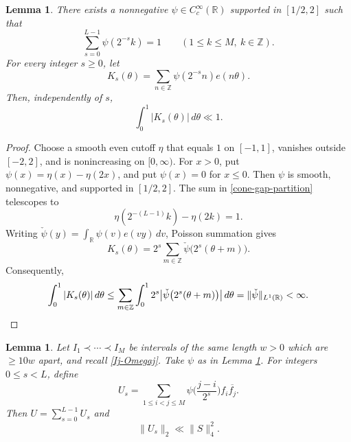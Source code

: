 \documentclass{amsart}
\numberwithin{equation}{section}
\newtheorem{lemma}[theorem]{Lemma}
\newcommand{\ZR}{\mathbb{R}}
\newcommand{\ZZ}{\mathbb{Z}}
\begin{document}
\begin{samepage}
\begin{lemma}
\label{cone-kernel-lem}
There exists a nonnegative $\psi\in C_c^\infty(\ZR)$ supported in $[1/2,2]$ such that
\begin{equation}
\label{cone-gap-partition}
    \sum_{s=0}^{L-1}\psi(2^{-s}k)=1
    \qquad(1\leq k\leq M,\ k\in\ZZ).
\end{equation}
For every integer $s\geq0$, let
\begin{equation}
\nonumber
    K_s(\theta)=\sum_{n\in\ZZ}\psi(2^{-s}n)e(n\theta).
\end{equation}
Then, independently of $s$,
\begin{equation}
\nonumber
    \int_0^1|K_s(\theta)|\,d\theta\ll1.
\end{equation}
\end{lemma}
\end{samepage}

\begin{proof}
Choose a smooth even cutoff $\eta$ that equals $1$ on $[-1,1]$, vanishes outside $[-2,2]$, and is nonincreasing on $[0,\infty)$.
For $x>0$, put $\psi(x)=\eta(x)-\eta(2x)$, and put $\psi(x)=0$ for $x\leq0$. 
Then $\psi$ is smooth, nonnegative, and supported in
$[1/2,2]$. 
The sum in \eqref{cone-gap-partition} telescopes to
\[
    \eta(2^{-(L-1)}k)-\eta(2k)=1.
\]
Writing $\check\psi(y)=\int_{\ZR}\psi(v)e(vy)\,dv$, Poisson summation gives
\[
    K_s(\theta)=2^s\sum_{m\in\ZZ}
      \check\psi\big(2^s(\theta+m)\big).
\]
Consequently,
\[
    \int_0^1|K_s(\theta)|\,d\theta
    \leq\sum_{m\in\ZZ}\int_0^1
      2^s\big|\check\psi\big(2^s(\theta+m)\big)\big|\,d\theta=\|\check\psi\|_{L^1(\ZR)}<\infty.  \qedhere
\]
\end{proof}

\medskip 

\begin{lemma}
\label{cone-dyadic-lem}
Let $I_1\prec\cdots\prec I_M$ be intervals of the same length $w>0$ which are $\geq10w$ apart, and recall \eqref{Ij-Omegaj}.
Take $\psi$ as in Lemma \ref{cone-kernel-lem}.
For integers $0\leq s<L$, define
\begin{equation}
\nonumber
    U_s=\sum_{1\leq i<j\leq M}
      \psi\Big(\frac{j-i}{2^s}\Big)f_i\overline{f_j}.
\end{equation}
Then $U=\sum_{s=0}^{L-1}U_s$ and
\begin{equation}
\nonumber
    \|U_s\|_2\ll\|S\|_4^2.
\end{equation}
\end{lemma}
\end{document}
